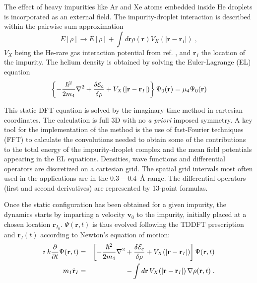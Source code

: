 The effect of heavy impurities like Ar and 
Xe atoms embedded inside He droplets is incorporated as an external field. 
The impurity-droplet interaction is 
described within the pairwise sum approximation  
%
\begin{equation}
E[\rho] \rightarrow E[\rho] +  \int d {\mathbf r} \rho({\mathbf r}) V_X(|{\mathbf r} - {\mathbf r}_I|)  \; ,
\label{eq6}
\end{equation}
%
$V_X$ being the He-rare gas interaction potential from 
ref. \cite{Tan86}, and ${\mathbf r}_I$ the location 
of the impurity. The helium density is obtained  by solving the 
Euler-Lagrange (EL) equation
%
\begin{equation}
\left\{-\frac{\hbar^2}{2m_4} \nabla^2 + \frac{\delta {\cal E}_c}{\delta \rho}  + V_X(|{\mathbf r} - {\mathbf r}_I|) \right\}\Psi_0({\mathbf r})  
= \mu_4 \Psi_0({\mathbf r})
\label{eq7}
\end{equation}

This static DFT equation is solved by the imaginary time method in cartesian coordinates. 
The calculation is full 3D with no {\it a priori} imposed symmetry.
A key tool for the implementation of the method is the use of 
fast-Fourier techniques (FFT)\cite{Fri05} to calculate the convolutions needed to
obtain some of the contributions to the total energy of the 
impurity-droplet complex and the mean field potentials appearing
in the EL equations.
Densities, wave functions and differential operators are discretized on a cartesian grid. The 
spatial grid intervals most often used in the applications are in the $0.3-0.4$~\AA{} range.
The differential operators (first and second derivatives) are represented by 13-point formulas. 

Once the static configuration has been obtained for a given impurity,  
the dynamics starts by imparting a velocity 
$\mathbf{v}_0$ to the impurity, initially 
placed at a chosen location $\mathbf{r}_{I_0}$.
 $\Psi(\mathbf{r}, t)$ is thus evolved following the TDDFT 
prescription and $\mathbf{r}_I(t)$ according to Newton's equation of motion:
%
\begin{eqnarray}
\imath \; \hbar\frac{\partial}{\partial t} \Psi(\mathbf{r}, t)
&=&
\left[
  -\frac{\hbar^2}{2m_4} \nabla^2 +
  \frac{\delta {\cal E}_c}{\delta \rho}
  +
  V_{X}(|\mathbf{r}- \mathbf{r}_I|)
\right]
\Psi(\mathbf{r}, t)
\nonumber
\\
m_I \ddot{\mathbf{r}}_I
&=&
-  \int d \mathbf{r} \, V_{X}(|\mathbf{r}- \mathbf{r}_I|)  \, \nabla \rho(\mathbf{r},t) 
 \; .
\label{eq8}
\end{eqnarray}
%


